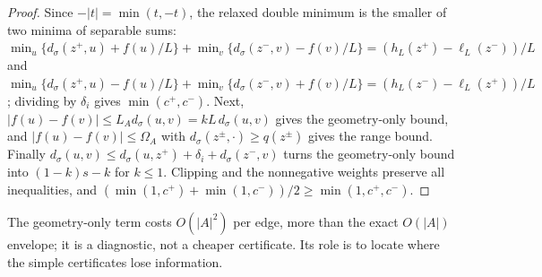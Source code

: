 \begin{proof}
Since $-|t|=\min(t,-t)$, the relaxed double minimum is the smaller of two minima of separable sums:
$\min_{u}\{d_\sigma(z^+,u)+f(u)/L\}+\min_v\{d_\sigma(z^-,v)-f(v)/L\}=(h_L(z^+)-\ell_L(z^-))/L$ and
$\min_u\{d_\sigma(z^+,u)-f(u)/L\}+\min_v\{d_\sigma(z^-,v)+f(v)/L\}=(h_L(z^-)-\ell_L(z^+))/L$; dividing by $\delta_i$ gives
$\min(c^+,c^-)$. Next, $|f(u)-f(v)|\le L_A d_\sigma(u,v)=kL\,d_\sigma(u,v)$ gives the geometry-only bound, and
$|f(u)-f(v)|\le\Omega_A$ with $d_\sigma(z^\pm,\cdot)\ge q(z^\pm)$ gives the range bound. Finally
$d_\sigma(u,v)\le d_\sigma(u,z^+)+\delta_i+d_\sigma(z^-,v)$ turns the geometry-only bound into $(1-k)s-k$ for $k\le1$. Clipping
and the nonnegative weights preserve all inequalities, and $(\min(1,c^+)+\min(1,c^-))/2\ge\min(1,c^+,c^-)$.
\end{proof}

The geometry-only term costs $O(|A|^2)$ per edge, more than the exact $O(|A|)$ envelope; it is a diagnostic, not a
cheaper certificate. Its role is to locate where the simple certificates lose information.
